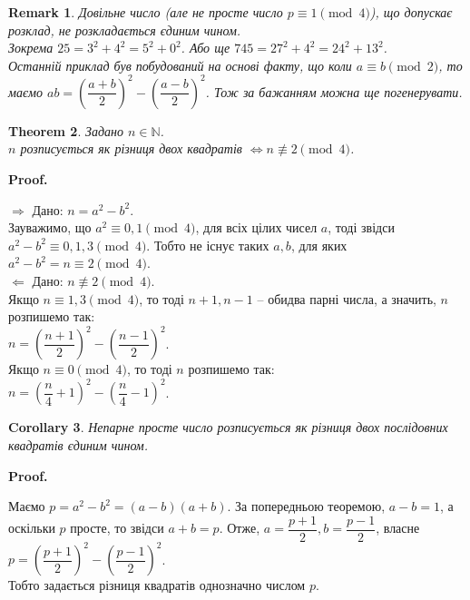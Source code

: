 \documentclass[a4paper, 14pt]{extarticle}
\makeatletter
\theoremstyle{theoremdd}
\newtheorem{theorem}{Theorem}[subsection]
\theoremstyle{theoremdd}
\theoremstyle{theoremdd}
\theoremstyle{theoremdd}
\theoremstyle{theoremdd}
\theoremstyle{theoremdd}
\newtheorem{remark}[theorem]{Remark}
\theoremstyle{theoremdd}
\theoremstyle{theoremdd}
\newtheorem{corollary}[theorem]{Corollary}
\def\qed{$\blacksquare$}
\def\rightproof{$\boxed{\Rightarrow}$ }
\def\leftproof{$\boxed{\Leftarrow}$ }
\renewenvironment{proof}[1][Proof.\\]{\par
\pushQED{\hfill \qed}%
\normalfont \topsep6\p@\@plus6\p@\relax
\trivlist
\item\relax
{\bfseries
#1\@addpunct{.}}\hspace\labelsep\ignorespaces
}{%
\popQED\endtrivlist\@endpefalse
}
\makeatother
\begin{document}
\begin{remark}
Довільне число (але не просте число $p \equiv 1 \pmod 4$), що допускає розклад, не розкладається єдиним чином.\\
Зокрема $25 = 3^2 + 4^2 = 5^2 + 0^2$. Або ще $745 = 27^2 + 4^2 = 24^2 + 13^2$.\\
Останній приклад був побудований на основі факту, що коли $a \equiv b \pmod 2$, то маємо $ab = \left( \dfrac{a+b}{2} \right)^2 - \left( \dfrac{a-b}{2} \right)^2$. Тож за бажанням можна ще погенерувати.
\end{remark}

\begin{theorem}
Задано $n \in \mathbb{N}$.\\
$n$ розписується як різниця двох квадратів $\iff n \not\equiv 2 \pmod 4$.
\end{theorem}

\begin{proof}
\rightproof Дано: $n = a^2-b^2$.\\
Зауважимо, що $a^2 \equiv 0,1 \pmod 4$, для всіх цілих чисел $a$, тоді звідси $a^2-b^2 \equiv 0,1,3 \pmod 4$. Тобто не існує таких $a,b$, для яких $a^2-b^2 = n \equiv 2 \pmod 4$.
\bigskip \\
\leftproof Дано: $n \not\equiv 2 \pmod 4$.\\
Якщо $n \equiv 1,3 \pmod 4$, то тоді $n+1,n-1$ -- обидва парні числа, а значить, $n$ розпишемо так:\\
$n = \left( \dfrac{n+1}{2} \right)^2 - \left( \dfrac{n-1}{2} \right)^2$.\\
Якщо $n \equiv 0 \pmod 4$, то тоді $n$ розпишемо так:\\
$n = \left( \dfrac{n}{4} + 1 \right)^2 - \left( \dfrac{n}{4} - 1 \right)^2$.
\end{proof}

\begin{corollary}
Непарне просте число розписується як різниця двох послідовних квадратів єдиним чином.
\end{corollary}

\begin{proof}
Маємо $p = a^2-b^2 = (a-b)(a+b)$. За попередньою теоремою, $a-b=1$, а оскільки $p$ просте, то звідси $a+b=p$. Отже, $a = \dfrac{p+1}{2}, b = \dfrac{p-1}{2}$, власне\\
$p = \left( \dfrac{p+1}{2} \right)^2 - \left( \dfrac{p-1}{2} \right)^2$.\\
Тобто задається різниця квадратів однозначно числом $p$.
\end{proof}
\end{document}
